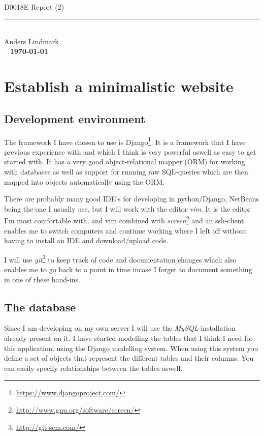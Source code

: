 \documentclass[12pt, a4paper,titlepage]{article}
\begin{document}
\ifpdf
{}
\else
{}
\fi

\begin{titlepage}
\ 
\begin{center}
\vfill
{\huge\sffamily D0018E Report (2)}
\rule{\linewidth}{0.3mm}\\
Anders Lindmark \\
\vfill
\ 
\vfill
{\textbf{\today}}
\end{center}
\end{titlepage}

\tableofcontents
\newpage

\section{Establish a minimalistic website}
\subsection{Development environment}
The framework I have chosen to use is
Django\footnote{\url{https://www.djangoproject.com/}}. 
It is a framework that I have previous experience with and which I think is
very powerful aswell as easy to get started with.
It has a very good object-relational mapper (ORM) for working with databases as well
as support for running raw SQL-queries which are then mapped into objects
automatically using the ORM.

There are probably many good IDE's for developing in python/Django, NetBeans
being the one I usually use, but I will work with the editor \emph{vim}. It is the 
editor I'm most comfortable with, and vim combined with
\emph{screen}\footnote{\url{http://www.gnu.org/software/screen/}} and an
ssh-client enables me to switch computers and continue working where I left
off without having to install an IDE and download/upload code.

I will use \emph{git}\footnote{\url{http://git-scm.com/}} to keep track of code
and documentation changes which also enables me to go back to a point in
time incase I forget to document something in one of these hand-ins.

\subsection{The database}
Since I am developing on my own server I will use the 
\emph{MySQL}-installation already present on it.
I have started modelling the tables that I think I need for this application, using
the Django modelling system. When using this system you define a set of 
objects that represent the different tables and their columns. You can easily
specify relationships between the tables aswell. 
\end{document}
